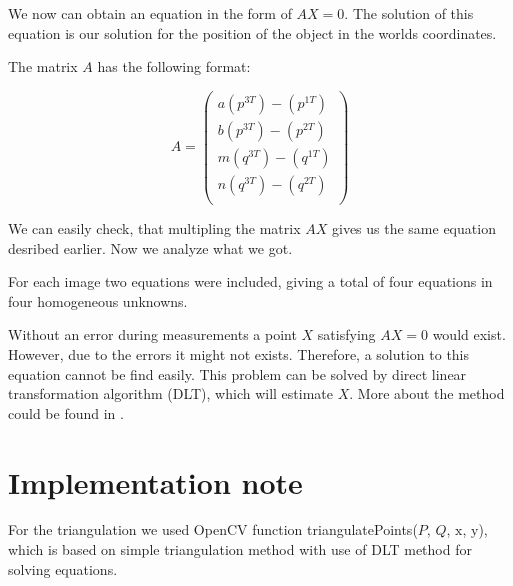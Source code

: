 We now can obtain an equation in the form of $AX = 0$. The solution of this
equation is our solution for the position of the object in the worlds
coordinates.

The matrix $A$ has the following format:

\[
A = \begin{pmatrix}
a(p^{3T}) - (p^{1T}) \\
b(p^{3T}) - (p^{2T}) \\
m(q^{3T}) - (q^{1T}) \\
n(q^{3T}) - (q^{2T}) \\
\end{pmatrix}
\]

We can easily check, that multipling the matrix $AX$ gives us the same equation
desribed earlier. Now we analyze what we got.

For each image two equations were included, giving a total of four equations in
four homogeneous unknowns.

Without an error during measurements a point $X$ satisfying $AX = 0$ would
exist. However, due to the errors it might not exists. Therefore, a solution to
this equation cannot be find easily. This problem can be solved by direct
linear transformation algorithm (DLT), which will estimate $X$. More about the
method could be found in \citet*{multiple-view-geometry}.

\section{Implementation note}
For the triangulation we used OpenCV function triangulatePoints($P$, $Q$,
$\mathrm{x}$, $\mathrm{y}$), which is based on simple triangulation method with use of DLT
method for solving equations.
